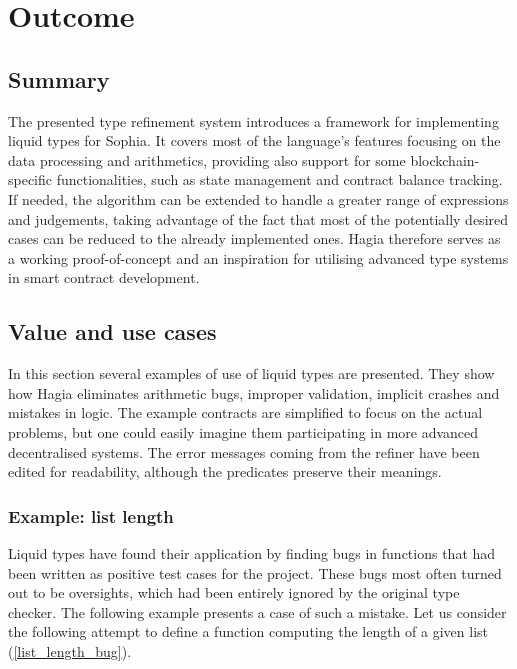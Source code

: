 \chapter{Outcome}
\label{outcome}

\section{Summary}

The presented type refinement system introduces a framework for implementing
liquid types for Sophia. It covers most of the language's features focusing on
the data processing and arithmetics, providing also support for some
blockchain-specific functionalities, such as state management and contract
balance tracking. If needed, the algorithm can be extended to handle a greater
range of expressions and judgements, taking advantage of the fact that most of
the potentially desired cases can be reduced to the already implemented ones.
Hagia therefore serves as a working proof-of-concept and an inspiration for
utilising advanced type systems in smart contract development.

\section{Value and use cases}

In this section several examples of use of liquid types are presented. They show
how Hagia eliminates arithmetic bugs, improper validation, implicit crashes and
mistakes in logic. The example contracts are simplified to focus on the actual
problems, but one could easily imagine them participating in more advanced
decentralised systems. The error messages coming from the refiner have been
edited for readability, although the predicates preserve their meanings.

\subsection{Example: list length}

Liquid types have found their application by finding bugs in functions that had
been written as positive test cases for the project. These bugs most often
turned out to be oversights, which had been entirely ignored by the original
type checker. The following example presents a case of such a mistake. Let us
consider the following attempt to define a function computing the length of a
given list (\autoref{list_length_bug}).

